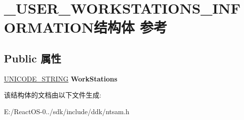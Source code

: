 \hypertarget{struct___u_s_e_r___w_o_r_k_s_t_a_t_i_o_n_s___i_n_f_o_r_m_a_t_i_o_n}{}\section{\+\_\+\+U\+S\+E\+R\+\_\+\+W\+O\+R\+K\+S\+T\+A\+T\+I\+O\+N\+S\+\_\+\+I\+N\+F\+O\+R\+M\+A\+T\+I\+O\+N结构体 参考}
\label{struct___u_s_e_r___w_o_r_k_s_t_a_t_i_o_n_s___i_n_f_o_r_m_a_t_i_o_n}
\subsection*{Public 属性}
\begin{DoxyCompactItemize}
\item 
\mbox{\label{struct___u_s_e_r___w_o_r_k_s_t_a_t_i_o_n_s___i_n_f_o_r_m_a_t_i_o_n_ad78982e2b7c140b2dab8db3468b0bf6a}} 
\hyperlink{struct___u_n_i_c_o_d_e___s_t_r_i_n_g}{U\+N\+I\+C\+O\+D\+E\+\_\+\+S\+T\+R\+I\+NG} {\bfseries Work\+Stations}
\end{DoxyCompactItemize}


该结构体的文档由以下文件生成\+:\begin{DoxyCompactItemize}
\item 
E\+:/\+React\+O\+S-\/0../sdk/include/ddk/ntsam.\+h\end{DoxyCompactItemize}
